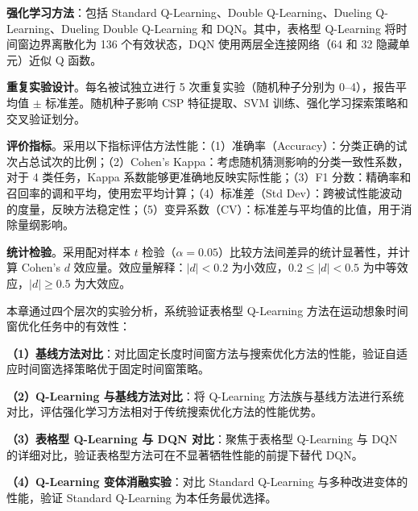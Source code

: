 \textbf{强化学习方法}：包括 Standard Q-Learning\cite{watkins1992q}、Double Q-Learning\cite{van2016deep, hasselt2010double}、Dueling Q-Learning\cite{wang2016dueling}、Dueling Double Q-Learning 和 DQN\cite{mnih2015human}。其中，表格型 Q-Learning 将时间窗边界离散化为 136 个有效状态，DQN 使用两层全连接网络（64 和 32 隐藏单元）近似 Q 函数。

\label{subsec:evaluation_protocol}

\textbf{重复实验设计}。每名被试独立进行 5 次重复实验（随机种子分别为 0--4），报告平均值 $\pm$ 标准差。随机种子影响 CSP 特征提取、SVM 训练、强化学习探索策略和交叉验证划分。

\textbf{评价指标}。采用以下指标评估方法性能\cite{tangermann2012review, cohen1960coefficient}：（1）准确率（Accuracy）：分类正确的试次占总试次的比例；（2）Cohen's Kappa：考虑随机猜测影响的分类一致性系数，对于 4 类任务，Kappa 系数能够更准确地反映实际性能；（3）F1 分数：精确率和召回率的调和平均，使用宏平均计算；（4）标准差（Std Dev）：跨被试性能波动的度量，反映方法稳定性；（5）变异系数（CV）：标准差与平均值的比值，用于消除量纲影响。

\textbf{统计检验}。采用配对样本 $t$ 检验（$\alpha = 0.05$）比较方法间差异的统计显著性，并计算 Cohen's $d$ 效应量\cite{field2013discovering, cohen1988statistical}。效应量解释：$|d| < 0.2$ 为小效应，$0.2 \leq |d| < 0.5$ 为中等效应，$|d| \geq 0.5$ 为大效应。

\label{subsec:experimental_procedure}

本章通过四个层次的实验分析，系统验证表格型 Q-Learning 方法在运动想象时间窗优化任务中的有效性：

\textbf{（1）基线方法对比}：对比固定长度时间窗方法与搜索优化方法的性能，验证自适应时间窗选择策略优于固定时间窗策略。

\textbf{（2）Q-Learning 与基线方法对比}：将 Q-Learning 方法族与基线方法进行系统对比，评估强化学习方法相对于传统搜索优化方法的性能优势。

\textbf{（3）表格型 Q-Learning 与 DQN 对比}：聚焦于表格型 Q-Learning 与 DQN 的详细对比，验证表格型方法可在不显著牺牲性能的前提下替代 DQN。

\textbf{（4）Q-Learning 变体消融实验}：对比 Standard Q-Learning 与多种改进变体的性能，验证 Standard Q-Learning 为本任务最优选择。

\label{sec:baseline_results}

\label{subsec:fixed_vs_search}

